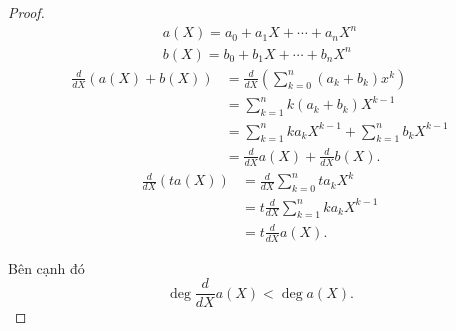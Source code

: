 \begin{proof}
    \[
        \begin{split}
            a(X) = a_{0} + a_{1}X + \cdots + a_{n}X^{n} \\
            b(X) = b_{0} + b_{1}X + \cdots + b_{n}X^{n}
        \end{split}
    \]
    \begin{align*}
        \frac{d}{dX}(a(X) + b(X)) & = \frac{d}{dX}\left(\sum^{n}_{k=0}(a_{k}+b_{k})x^{k}\right) \\
                                  & = \sum^{n}_{k=1}k(a_{k}+b_{k})X^{k-1}                       \\
                                  & = \sum^{n}_{k=1}ka_{k}X^{k-1} + \sum^{n}_{k=1}b_{k}X^{k-1}  \\
                                  & = \frac{d}{dX}a(X) + \frac{d}{dX}b(X).
    \end{align*}
    \begin{align*}
        \frac{d}{dX}(ta(X)) & = \frac{d}{dX}\sum^{n}_{k=0}ta_{k}X^{k}    \\
                            & = t\frac{d}{dX}\sum^{n}_{k=1}ka_{k}X^{k-1} \\
                            & = t\frac{d}{dX}a(X).
    \end{align*}
    
    Bên cạnh đó
    \[
        \deg \frac{d}{dX}a(X) < \deg a(X).
    \]
    

\end{proof}
